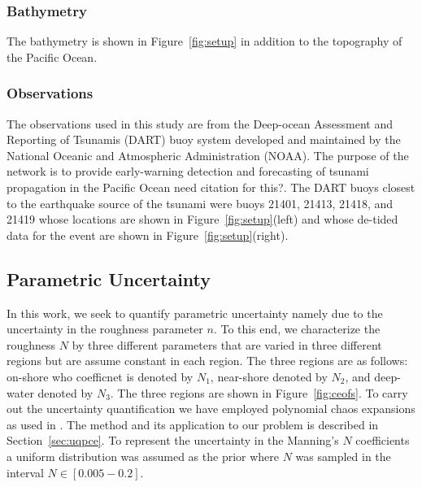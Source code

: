 \subsubsection{Bathymetry}
The bathymetry is shown in Figure~\ref{fig:setup} in addition to the topography
of the Pacific Ocean.
\subsubsection{Observations}

The observations used in this study are from the Deep-ocean Assessment and Reporting of Tsunamis (DART) buoy system developed and maintained by the National Oceanic and Atmospheric Administration (NOAA).  The purpose of the network is to provide early-warning detection and forecasting of tsunami propagation in the Pacific Ocean \alert{need citation for this?}.  The DART buoys closest to the earthquake source of the \tohoku tsunami were buoys 21401, 21413, 21418, and 21419 whose locations are shown in Figure~\ref{fig:setup}(left) and whose de-tided data for the event are shown in Figure~\ref{fig:setup}(right).
\subsection{Parametric Uncertainty}
In this work, we seek to quantify parametric uncertainty namely due 
to the uncertainty in the roughness parameter $n$. To this end,
we characterize the roughness $N$ by three different parameters
that are varied in three different regions but are assume
constant in each region. The three regions are as follows: 
on-shore who coefficnet is denoted by $N_1$, near-shore 
denoted by $N_2$, and deep-water denoted by $N_3$.
The three regions are shown in Figure~\ref{fig:ceofs}.
To carry out the uncertainty quantification we have employed polynomial chaos expansions 
as used in \cite{sraj:2013a,sraj:2013b}. The method and its application
to our problem is described in Section~\ref{sec:uqpce}.  
To represent the uncertainty in the Manning's $N$ coefficients a uniform distribution was assumed as the prior where $N$ was sampled in the interval $N \in [0.005-0.2]$.  
